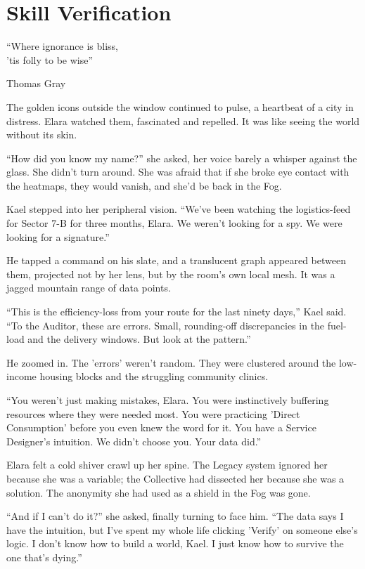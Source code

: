
\chapter{Skill Verification}
\epigraph{``Where ignorance is bliss,\\’tis folly to be wise''}{Thomas Gray} %

The golden icons outside the window continued to pulse, a heartbeat of a city in distress. Elara watched them, fascinated and repelled. It was like seeing the world without its skin.

``How did you know my name?'' she asked, her voice barely a whisper against the glass. She didn't turn around. She was afraid that if she broke eye contact with the heatmaps, they would vanish, and she’d be back in the Fog.

Kael stepped into her peripheral vision. ``We’ve been watching the logistics-feed for Sector 7-B for three months, Elara. We weren't looking for a spy. We were looking for a signature.''

He tapped a command on his slate, and a translucent graph appeared between them, projected not by her lens, but by the room’s own local mesh. It was a jagged mountain range of data points.

``This is the efficiency-loss from your route for the last ninety days,'' Kael said. ``To the Auditor, these are errors. Small, rounding-off discrepancies in the fuel-load and the delivery windows. But look at the pattern.''

He zoomed in. The 'errors' weren't random. They were clustered around the low-income housing blocks and the struggling community clinics. 

``You weren't just making mistakes, Elara. You were instinctively buffering resources where they were needed most. You were practicing 'Direct Consumption' before you even knew the word for it. You have a Service Designer’s intuition. We didn't choose you. Your data did.''



Elara felt a cold shiver crawl up her spine. The Legacy system ignored her because she was a variable; the Collective had dissected her because she was a solution. The anonymity she had used as a shield in the Fog was gone.

``And if I can't do it?'' she asked, finally turning to face him. ``The data says I have the intuition, but I've spent my whole life clicking 'Verify' on someone else’s logic. I don't know how to build a world, Kael. I just know how to survive the one that's dying.''

